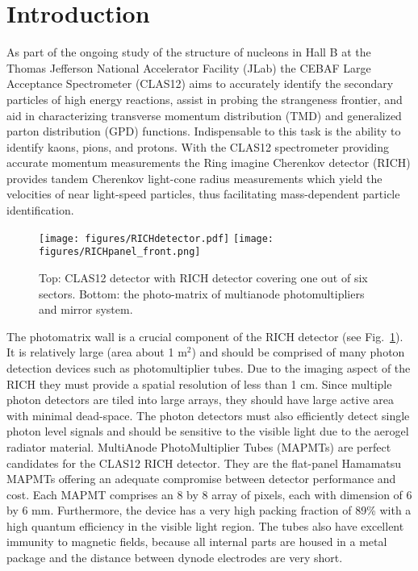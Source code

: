 \section{Introduction}
As part of the ongoing study of the structure of nucleons \cite{Avakian:2010ae}  in Hall B at the Thomas Jefferson National Accelerator Facility (JLab)  the CEBAF Large Acceptance Spectrometer (CLAS12) \cite{Burkert:2020akg} aims to accurately identify the secondary particles of high energy reactions, assist in probing the strangeness frontier, and aid in characterizing transverse momentum distribution (TMD) and generalized parton distribution (GPD) functions. Indispensable to this task is the ability to identify kaons, pions, and protons.  With the CLAS12 spectrometer providing accurate momentum measurements the Ring imagine Cherenkov detector (RICH) \cite{Contalbrigo:2020,Contalbrigo:2020snw,Mirazita:2017vav,Contalbrigo:2014rqa} provides tandem Cherenkov light-cone radius measurements which yield the velocities of near light-speed particles, thus facilitating mass-dependent particle identification.

\begin{figure}[h!bt]
	\centering
	\texttt{[image: figures/RICHdetector.pdf]}
	\texttt{[image: figures/RICHpanel\_front.png]}
	\caption{Top: CLAS12 detector with RICH detector covering one out of six sectors. Bottom: the photo-matrix of multianode photomultipliers and mirror system.}
	\label{fig:RICHdetector}
\end{figure}

The photomatrix  wall is a crucial component of the RICH detector (see Fig.~\ref{fig:RICHdetector}). It is relatively large (area about 1 m$^2$) and should be comprised of many photon detection devices such as photomultiplier tubes.
Due to the imaging aspect of the RICH they must provide a spatial resolution of less than 1 cm.
Since multiple photon detectors are tiled into large arrays, they should have large active area with minimal dead-space.
The photon detectors must also efficiently detect single photon level signals and should be sensitive to the visible light due to the aerogel radiator material.
MultiAnode PhotoMultiplier Tubes (MAPMTs) are perfect candidates for the CLAS12 RICH detector.
They are the flat-panel Hamamatsu MAPMTs offering an adequate compromise between detector performance and cost.
Each MAPMT comprises an 8 by 8 array of pixels, each with dimension of 6 by 6 mm.
Furthermore, the device has a very high packing fraction of 89\% with a high quantum efficiency in the visible light region.
The tubes also have excellent immunity to magnetic fields, because all internal parts are housed in a metal package and the distance between dynode electrodes are very short.


